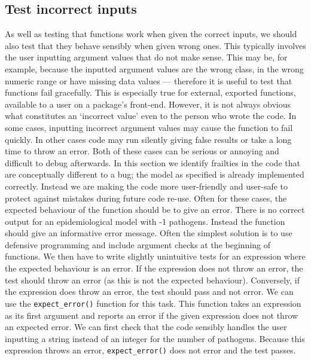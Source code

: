 \documentclass[
]{article}
\begin{document}
\hypertarget{testincorrect}{%
\subsection*{Test incorrect inputs}\label{testincorrect}}

As well as testing that functions work when given the correct inputs, we should also test that they behave sensibly when given wrong ones.
This typically involves the user inputting argument values that do not make sense.
This may be, for example, because the inputted argument values are the wrong class, in the wrong numeric range or have missing data values --- therefore it is useful to test that functions fail gracefully.
This is especially true for external, exported functions, available to a user on a package's front-end.
However, it is not always obvious what constitutes an `incorrect value' even to the person who wrote the code.
In some cases, inputting incorrect argument values may cause the function to fail quickly.
In other cases code may run silently giving false results or take a long time to throw an error.
Both of these cases can be serious or annoying and difficult to debug afterwards.
In this section we identify frailties in the code that are conceptually different to a bug; the model as specified is already implemented correctly.
Instead we are making the code more user-friendly and user-safe to protect against mistakes during future code re-use.
\newline
\newline
Often for these cases, the expected behaviour of the function should be to give an error.
There is no correct output for an epidemiological model with -1 pathogens.
Instead the function should give an informative error message.
Often the simplest solution is to use defensive programming and include argument checks at the beginning of functions.
We then have to write slightly unintuitive tests for an expression where the expected behaviour is an error.
If the expression does not throw an error, the test should throw an error (as this is not the expected behaviour).
Conversely, if the expression does throw an error, the test should pass and not error.
We can use the \texttt{expect\_error()} function for this task.
This function takes an expression as its first argument and reports an error if the given expression does not throw an expected error.
\newline
\newline
We can first check that the code sensibly handles the user inputting a string instead of an integer for the number of pathogens.
Because this expression throws an error, \texttt{expect\_error()} does not error and the test passes.
\newline
{}\label{wrong1}
\end{document}
